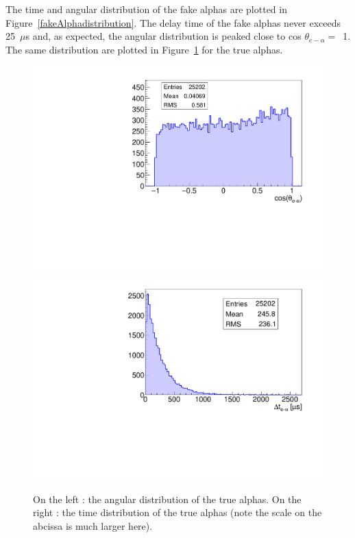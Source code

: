 \documentclass[main.tex]{subfiles}
\begin{document}
\noindent The time and angular distribution of the fake alphas are plotted in Figure~\ref{fakeAlphadistribution}. The delay time of the fake alphas never exceeds 25~$\mu$s and, as expected, the angular distribution is peaked close to cos $\theta_{e-\alpha} =$~1. The same distribution are plotted in Figure~\ref{trueAlphadistribution} for the true alphas.


\begin{figure}[h!]
\begin{center}
\includegraphics[scale=0.34]{pictures/Chap5/true_alpha_angle_distribution.pdf}
\includegraphics[scale=0.34]{pictures/Chap5/true_alpha_delayed_time.pdf}
\caption{On the left : the angular distribution of the true alphas. On the right : the time distribution of the true alphas (note the scale on the abcissa is much larger here).}
\label{trueAlphadistribution}
\end{center}
\end{figure}
\end{document}
